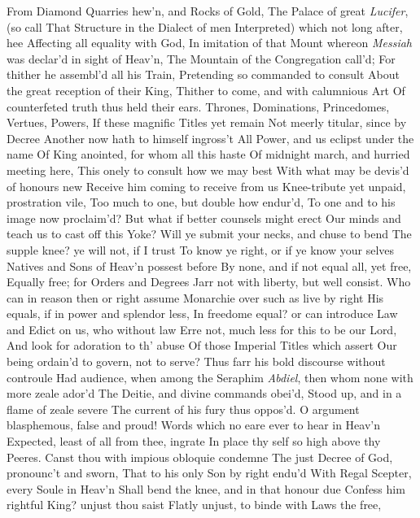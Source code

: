 \documentclass[11pt]{book}
\begin{document}
From Diamond Quarries hew'n, and Rocks of Gold, 
The Palace of great \textit{Lucifer}, (so call 
That Structure in the Dialect of men 
Interpreted) which not long after, hee 
Affecting all equality with God, 
In imitation of that Mount whereon 
\textit{Messiah} was declar'd in sight of Heav'n, 
The Mountain of the Congregation call'd; 
For thither he assembl'd all his Train, 
Pretending so commanded to consult 
About the great reception of their King, 
Thither to come, and with calumnious Art 
Of counterfeted truth thus held their ears. 
\quad Thrones, Dominations, Princedomes, Vertues, Powers, 
If these magnific Titles yet remain 
Not meerly titular, since by Decree 
Another now hath to himself ingross't 
All Power, and us eclipst under the name 
Of King anointed, for whom all this haste 
Of midnight march, and hurried meeting here, 
This onely to consult how we may best 
With what may be devis'd of honours new 
Receive him coming to receive from us 
Knee-tribute yet unpaid, prostration vile, 
Too much to one, but double how endur'd, 
To one and to his image now proclaim'd? 
But what if better counsels might erect 
Our minds and teach us to cast off this Yoke? 
Will ye submit your necks, and chuse to bend 
The supple knee? ye will not, if I trust 
To know ye right, or if ye know your selves 
Natives and Sons of Heav'n possest before 
By none, and if not equal all, yet free, 
Equally free; for Orders and Degrees 
Jarr not with liberty, but well consist. 
Who can in reason then or right assume 
Monarchie over such as live by right 
His equals, if in power and splendor less, 
In freedome equal? or can introduce 
Law and Edict on us, who without law 
Erre not, much less for this to be our Lord, 
And look for adoration to th' abuse 
Of those Imperial Titles which assert 
Our being ordain'd to govern, not to serve? 
\quad Thus farr his bold discourse without controule 
Had audience, when among the Seraphim 
\textit{Abdiel}, then whom none with more zeale ador'd 
The Deitie, and divine commands obei'd, 
Stood up, and in a flame of zeale severe 
The current of his fury thus oppos'd. 
\quad O argument blasphemous, false and proud! 
Words which no eare ever to hear in Heav'n 
Expected, least of all from thee, ingrate 
In place thy self so high above thy Peeres. 
Canst thou with impious obloquie condemne 
The just Decree of God, pronounc't and sworn, 
That to his only Son by right endu'd 
With Regal Scepter, every Soule in Heav'n 
Shall bend the knee, and in that honour due 
Confess him rightful King? unjust thou saist 
Flatly unjust, to binde with Laws the free, 
\end{document}
